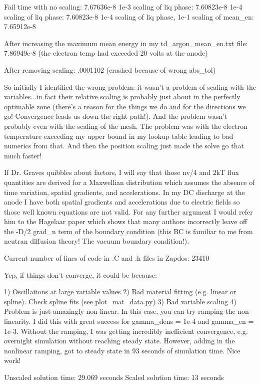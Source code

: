 {Fail time with no scaling: 7.67636e-8
1e-3 scaling of liq phase: 7.60823e-8
1e-4 scaling of liq phase: 7.60823e-8
1e-4 scaling of liq phase, 1e-1 scaling of mean_en: 7.65912e-8

After increasing the maximum mean energy in my td_argon_mean_en.txt file: 7.86949e-8 (the electron temp had exceeded 20 volts at the anode)

After removing scaling: .0001102 (crashed because of wrong abs_tol)

So initially I identified the wrong problem: it wasn't a problem of scaling with the variables...in fact their relative scaling is probably just about in the perfectly optimable zone (there's a reason for the things we do and for the directions we go! Convergence leads us down the right path!). And the problem wasn't probably even with the scaling of the mesh. The problem was with the electron temperature exceeding my upper bound in my lookup table leading to bad numerics from that. And then the position scaling just made the solve go that much faster!

If Dr. Graves quibbles about factors, I will say that those nv/4 and 2kT flux quantities are derived for a Maxwellian distribution which assumes the absence of time variation, spatial gradients, and accelerations. In my DC discharge at the anode I have both spatial gradients and accelerations due to electric fields so those well known equations are not valid. For any further argument I would refer him to the Hagelaar paper which shows that many authors incorrectly leave off the -D/2 grad_n term of the boundary condition (this BC is familiar to me from neutran diffusion theory! The vacuum boundary condition!).

Current number of lines of code in .C and .h files in Zapdos: 23410

Yep, if things don't converge, it could be because:

1) Oscillations at large variable values
2) Bad material fitting (e.g. linear or spline). Check spline fits (see plot_mat_data.py)
3) Bad variable scaling
4) Problem is just amazingly non-linear. In this case, you can try ramping the non-linearity. I did this with great success for gamma_dens = 1e-4 and gamma_en = 1e-3. Without the ramping, I was getting incredibly inefficient convergence, e.g. overnight simulation without reaching steady state. However, adding in the nonlinear ramping, got to steady state in 93 seconds of simulation time. Nice work!

Unscaled solution time: 29.069 seconds
Scaled solution time: 13 seconds

}
